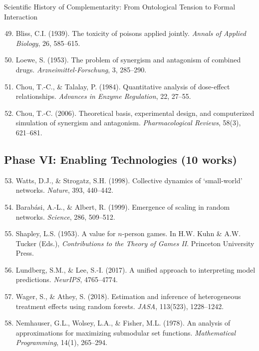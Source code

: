 \begin{chapter}{Scientific History of Complementarity: From Ontological Tension to Formal Interaction}
\begin{enumerate}
    \setcounter{enumi}{48}
    \item Bliss, C.I. (1939). The toxicity of poisons applied jointly. \textit{Annals of Applied Biology}, 26, 585--615.

    \item Loewe, S. (1953). The problem of synergism and antagonism of combined drugs. \textit{Arzneimittel-Forschung}, 3, 285--290.

    \item Chou, T.-C., \& Talalay, P. (1984). Quantitative analysis of dose-effect relationships. \textit{Advances in Enzyme Regulation}, 22, 27--55.

    \item Chou, T.-C. (2006). Theoretical basis, experimental design, and computerized simulation of synergism and antagonism. \textit{Pharmacological Reviews}, 58(3), 621--681.
\end{enumerate}

\subsection{Phase VI: Enabling Technologies (10 works)}

\begin{enumerate}
    \setcounter{enumi}{52}
    \item Watts, D.J., \& Strogatz, S.H. (1998). Collective dynamics of `small-world' networks. \textit{Nature}, 393, 440--442.

    \item Barabási, A.-L., \& Albert, R. (1999). Emergence of scaling in random networks. \textit{Science}, 286, 509--512.

    \item Shapley, L.S. (1953). A value for $n$-person games. In H.W. Kuhn \& A.W. Tucker (Eds.), \textit{Contributions to the Theory of Games II}. Princeton University Press.

    \item Lundberg, S.M., \& Lee, S.-I. (2017). A unified approach to interpreting model predictions. \textit{NeurIPS}, 4765--4774.

    \item Wager, S., \& Athey, S. (2018). Estimation and inference of heterogeneous treatment effects using random forests. \textit{JASA}, 113(523), 1228--1242.

    \item Nemhauser, G.L., Wolsey, L.A., \& Fisher, M.L. (1978). An analysis of approximations for maximizing submodular set functions. \textit{Mathematical Programming}, 14(1), 265--294.


\end{enumerate}
\end{chapter}
